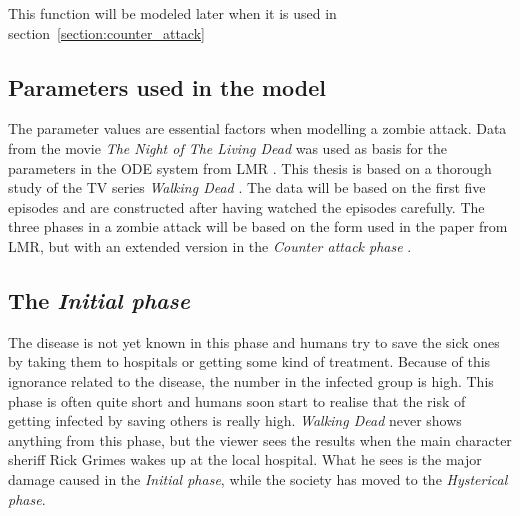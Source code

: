 \documentclass[%
twoside,                 %
final,                   %
chapterprefix=true,      %
open=right               %
10pt]{book}
\begin{document}
\noindent
This function will be modeled later when it is used in section~\ref{section:counter_attack}


\vspace{3mm}




\vspace{3mm}



\subsection{Parameters used in the model}
The parameter values are essential factors when modelling a zombie attack. Data from the movie \emph{The Night of The Living Dead} was used as basis for the parameters in the ODE system from LMR \cite{zombie-math}. This thesis is based on a thorough study of the TV series \emph{Walking Dead} \cite{walking_dead}. The data will be based on the first five episodes and are constructed after having watched the episodes carefully. The three phases in a zombie attack will be based on the form used in the paper from LMR, but with an extended version in the \emph{Counter attack phase} .

\subsection{The \emph{Initial phase}}
The disease is not yet known in this phase and humans try to save the sick ones by taking them to hospitals or getting some kind of treatment. Because of this ignorance related to the disease, the number in the infected group is high. This phase is often quite short and humans soon start to realise that the risk of getting infected by saving others is really high. \emph{Walking Dead} never shows anything from this phase, but the viewer sees the results when the main character sheriff Rick Grimes wakes up at the local hospital. What he sees is the major damage caused in the \emph{Initial phase}, while the society has moved to the \emph{Hysterical phase}.


\vspace{3mm}




\vspace{3mm}
\end{document}
